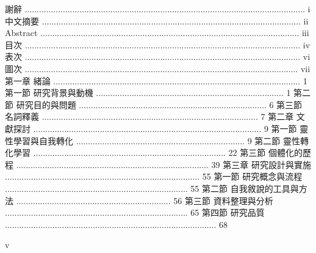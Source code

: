 謝辭 ...................................................................................................................... i 
中文摘要 ............................................................................................................. ii 
Abstract ............................................................................................................. iii 
目次 .................................................................................................................... iv 
表次 .................................................................................................................... vi 
圖次 ................................................................................................................... vii 
第一章 緒論 ........................................................................................................ 1 
第一節 研究背景與動機 ............................................................................... 1 
第二節 研究目的與問題 ............................................................................... 6 
第三節 名詞釋義 ........................................................................................... 7 
第二章 文獻探討 ................................................................................................ 9 
第一節 靈性學習與自我轉化 ....................................................................... 9 
第二節 靈性轉化學習 ................................................................................. 22 
第三節 個體化的歷程 ................................................................................. 39 
第三章 研究設計與實施 .................................................................................. 55 
第一節 研究概念與流程 ............................................................................. 55 
第二節 自我敘說的工具與方法 ................................................................. 56 
第三節 資料整理與分析 ............................................................................. 65 
第四節 研究品質 ......................................................................................... 68 
 
v 
 
